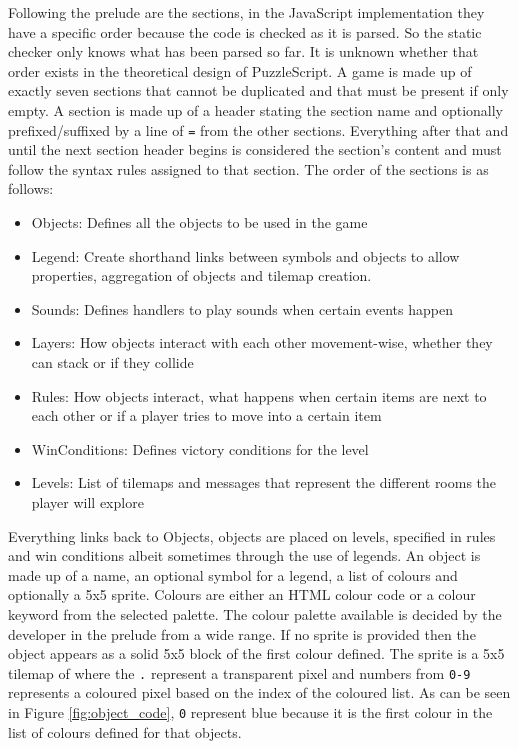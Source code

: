 Following the prelude are the sections, in the JavaScript implementation they have a specific order because the code is checked as it is parsed. So the static checker only knows what has been parsed so far. It is unknown whether that order exists in the theoretical design of PuzzleScript. A game is made up of exactly seven sections that cannot be duplicated and that must be present if only empty. A section is made up of a header stating the section name and optionally prefixed/suffixed by a line of \texttt{=} from the other sections. Everything after that and until the next section header begins is considered the section's content and must follow the syntax rules assigned to that section. The order of the sections is as follows:
\begin{itemize}
    \item Objects: Defines all the objects to be used in the game
    \item Legend: Create shorthand links between symbols and objects to allow properties, aggregation of objects and tilemap creation.
    \item Sounds: Defines handlers to play sounds when certain events happen
    \item Layers: How objects interact with each other movement-wise, whether they can stack or if they collide
    \item Rules: How objects interact, what happens when certain items are next to each other or if a player tries to move into a certain item
    \item WinConditions: Defines victory conditions for the level
    \item Levels: List of tilemaps and messages that represent the different rooms the player will explore
\end{itemize}

Everything links back to Objects, objects are placed on levels, specified in rules and win conditions albeit sometimes through the use of legends. An object is made up of a name, an optional symbol for a legend, a list of colours and optionally a 5x5 sprite. Colours are either an HTML colour code or a colour keyword from the selected palette. The colour palette available is decided by the developer in the prelude from a wide range. If no sprite is provided then the object appears as a solid 5x5 block of the first colour defined. The sprite is a 5x5 tilemap of where the \texttt{.} represent a transparent pixel and numbers from \texttt{0-9} represents a coloured pixel based on the index of the coloured list. As can be seen in Figure \ref{fig:object_code}, \texttt{0} represent blue because it is the first colour in the list of colours defined for that objects.

